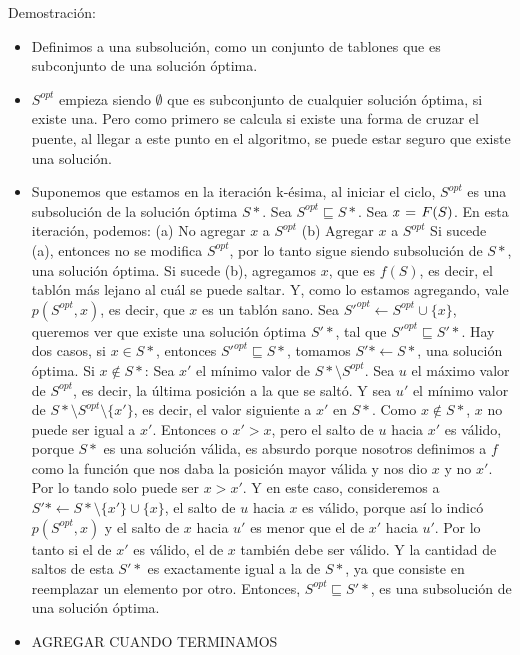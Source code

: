 \begin{itemize}
  Demostración:
  \begin{itemize}
    \item Definimos a una subsolución, como un conjunto de tablones que
    es subconjunto de una solución óptima.
    \item $S^{opt}$ empieza siendo $\emptyset$ que es subconjunto de cualquier
    solución óptima, si existe una. Pero como primero se calcula si
    existe una forma de cruzar el puente, al llegar a este punto en el
    algoritmo, se puede estar seguro que existe una solución.
    \item Suponemos que estamos en la iteración k-ésima, al iniciar
    el ciclo, $S^{opt}$ es una subsolución de la solución óptima $S*$.
    Sea $S^{opt} \sqsubseteq S*$.
    Sea $\id{x} \gets F(S)$.
    En esta iteración, podemos:
    (a) No agregar $x$ a $S^{opt}$
    (b) Agregar $x$ a $S^{opt}$
    Si sucede (a), entonces no se modifica $S^{opt}$, por lo tanto sigue
    siendo subsolución de $S*$, una solución óptima.
    Si sucede (b), agregamos $x$, que es $f(S)$, es decir, el tablón más
    lejano al cuál se puede saltar. Y, como lo estamos agregando, vale
    $p(S^{opt}, x)$, es decir, que $x$ es un tablón sano.
    Sea $S'^{opt} \gets S^{opt} \cup \{x\}$, queremos ver que existe una
    solución óptima $S'*$, tal que $S'^{opt} \sqsubseteq S'*$.
    Hay dos casos, si $x \in S*$, entonces $S'^{opt} \sqsubseteq S*$,
    tomamos $S'* \gets S*$, una solución óptima.
    Si $x \notin S*$:
    Sea $x'$ el mínimo valor de $S* \setminus S^{opt}$.
    Sea $u$ el máximo valor de $S^{opt}$, es decir, la última posición a la que
    se saltó.
    Y sea $u'$ el mínimo valor de $S* \setminus S^{opt} \setminus \{x'\}$, es
    decir, el valor siguiente a $x'$ en $S*$.
    Como $x \notin S*$, $x$ no puede ser igual a $x'$. Entonces o $x' > x$,
    pero el salto de $u$ hacia $x'$ es válido, porque $S*$ es una solución
    válida, es absurdo porque nosotros definimos a $f$ como la función que nos
    daba la posición mayor válida y nos dio $x$ y no $x'$.
    Por lo tando solo puede ser $x > x'$. Y en este caso, consideremos a
    $S'* \gets S* \setminus \{x'\} \cup \{x\}$, el salto de $u$ hacia $x$ es
    válido, porque así lo indicó $p(S^{opt}, x)$ y el salto de $x$ hacia $u'$
    es menor que el de $x'$ hacia $u'$. Por lo tanto si el de $x'$ es válido,
    el de $x$ también debe ser válido. Y la cantidad de saltos de esta $S'*$
    es exactamente igual a la de $S*$, ya que consiste en reemplazar un elemento
    por otro.
    Entonces, $S^{opt} \sqsubseteq S'*$, es una subsolución de una solución óptima.
    \item AGREGAR CUANDO TERMINAMOS

  \end{itemize}

\end{itemize}





